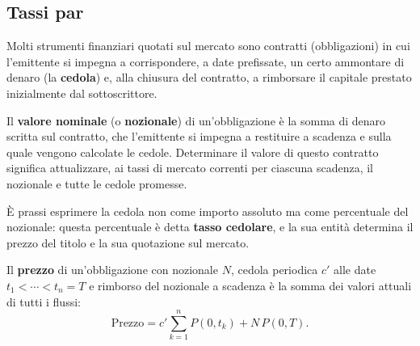 \documentclass[11pt,a4paper]{article}
\theoremstyle{plain}
\theoremstyle{definition}
\theoremstyle{remark}
\begin{document}
\subsection{Tassi par}
\label{sec:inputdati}

Molti strumenti finanziari quotati sul mercato sono contratti (obbligazioni) in cui l'emittente
si impegna a corrispondere, a date prefissate, un certo ammontare di denaro (la
\textbf{cedola}) e, alla chiusura del contratto, a rimborsare il capitale prestato
inizialmente dal sottoscrittore.

Il \textbf{valore nominale} (o \textbf{nozionale}) di un'obbligazione \`e la somma di
denaro scritta sul contratto, che l'emittente si impegna a restituire a scadenza e sulla
quale vengono calcolate le cedole. Determinare il valore di questo contratto significa
attualizzare, ai tassi di mercato correnti per ciascuna scadenza, il nozionale e tutte le
cedole promesse.

\`E prassi esprimere la cedola non come importo assoluto ma come percentuale del nozionale:
questa percentuale \`e detta \textbf{tasso cedolare}, e la sua entit\`a determina il prezzo del
titolo e la sua quotazione sul mercato.

Il \textbf{prezzo} di un'obbligazione con nozionale $N$, cedola periodica $c'$ alle
date $t_1 < \cdots < t_n = T$ e rimborso del nozionale a scadenza \`e la somma dei valori
attuali di tutti i flussi:
\begin{equation}
  \text{Prezzo} = c' \sum_{k=1}^{n} P(0,t_k) + N\,P(0,T).
  \label{eq:prezzo-bond}
\end{equation}
\end{document}
